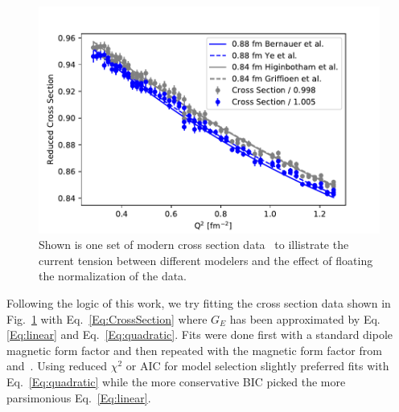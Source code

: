 \documentclass[10pt,aps,prc,twocolumn]{revtex4-1}
\begin{document}
\begin{figure}
\label{RealData}
\includegraphics[width=\columnwidth]{Figure/RealData.pdf} 
\caption{Shown is one set of modern cross section data~\cite{Bernauer:2013tpr} to illistrate the current tension between 
different modelers and the effect of floating the normalization of the data.}
\end{figure}

Following the logic of this work, we try fitting the cross section data shown in Fig.~\ref{RealData} with  Eq.~\ref{Eq:CrossSection} where
$G_E$ has been approximated by Eq.\ref{Eq:linear} and Eq.~\ref{Eq:quadratic}.    Fits were done first with a standard dipole magnetic form factor
and then repeated with the magnetic form factor from~\cite{Bernauer:2013tpr} and~\cite{Ye:2017gyb}.    
Using reduced $\chi^2$ or AIC for model selection slightly preferred fits with Eq.~\ref{Eq:quadratic} while the more conservative BIC picked the
more parsimonious Eq.~\ref{Eq:linear}.   
\end{document}
